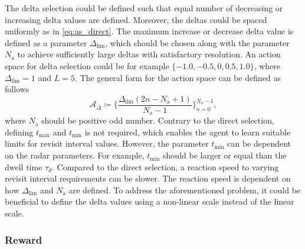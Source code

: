 \documentclass[english, 12pt, a4paper, elec, utf8, a-1b, online]{aaltothesis}
\newcommand{\As}{\mathcal{A}}
\newcommand{\tmax}{t_\text{max}}
\newcommand{\tmin}{t_\text{min}}
\newcommand{\deltalim}{\Delta_\text{lim}}
\newcommand{\Asdelta}{\As_\Delta}
\newcommand{\nacts}{{N_\text{a}}}
\begin{document}
The delta selection could be defined such that equal number of decreasing or increasing delta values are defined.
Moreover, the deltas could be spaced uniformly as in \eqref{eq:as_direct}.
The maximum increase or decrease delta value is defined as a parameter $\deltalim$, which should be chosen along with the parameter $\nacts$ to achieve sufficiently large deltas with satisfactory resolution.
An action space for delta selection could be for example $\{ -1.0, -0.5, 0, 0.5, 1.0 \}$, where $\deltalim=1$ and $L=5$.
The general form for the action space can be defined as follows
\begin{equation}\label{eq:as_delta}
    \Asdelta \coloneqq \{ \frac{\deltalim \left( 2 n - \nacts + 1 \right)}{\nacts-1} \}_{n=0}^{\nacts-1},
\end{equation}
where $\nacts$ should be positive odd number.
Contrary to the direct selection, defining $\tmax$ and $\tmin$ is not required, which enables the agent to learn suitable limits for revisit interval values.
However, the parameter $\tmin$ can be dependent on the radar parameters. 
For example, $\tmin$ should be larger or equal than the dwell time $\tau_d$.
Compared to the direct selection, a reaction speed to varying revisit interval requirements can be slower.
The reaction speed is dependent on how $\deltalim$ and $\nacts$ are defined.
To address the aforementioned problem, it could be beneficial to define the delta values using a non-linear scale instead of the linear scale.

\subsubsection{Reward} \label{sec:rewards}
\end{document}
